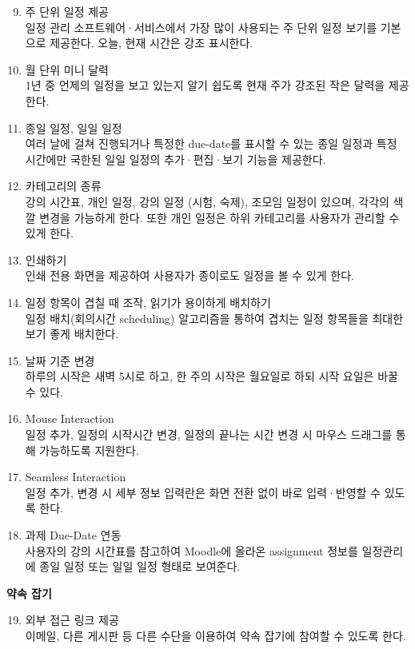 \documentclass[a4paper,titlepage]{article}
\begin{document}
\begin{funcreq}
\begin{enumerate}
		\setcounter{enumii}{8}
		\item 주 단위 일정 제공\\
		일정 관리 소프트웨어·서비스에서 가장 많이 사용되는 주 단위 일정 보기를 기본으로 제공한다. 
		오늘, 현재 시간은 강조 표시한다.
		\item 월 단위 미니 달력\\
		1년 중 언제의 일정을 보고 있는지 알기 쉽도록 현재 주가 강조된 작은 달력을 제공한다.
		\item 종일 일정, 일일 일정\\
		여러 날에 걸쳐 진행되거나 특정한 due-date를 표시할 수 있는 종일 일정과 특정 시간에만 국한된 일일 일정의 추가·편집·보기 기능을 제공한다.
		\item 카테고리의 종류\\
		강의 시간표, 개인 일정, 강의 일정 (시험, 숙제), 조모임 일정이 있으며, 각각의 색깔 변경을 가능하게 한다. 또한 개인 일정은 하위 카테고리를 사용자가 관리할 수 있게 한다.
		\item 인쇄하기\\
		인쇄 전용 화면을 제공하여 사용자가 종이로도 일정을 볼 수 있게 한다.
		\item 일정 항목이 겹칠 때 조작, 읽기가 용이하게 배치하기\\
		일정 배치(회의시간 scheduling) 알고리즘을 통하여 겹치는 일정 항목들을 최대한 보기 좋게 배치한다.
		\item 날짜 기준 변경\\
		하루의 시작은 새벽 5시로 하고, 한 주의 시작은 월요일로 하되 시작 요일은 바꿀 수 있다.
		\item Mouse Interaction\\
		일정 추가, 일정의 시작시간 변경, 일정의 끝나는 시간 변경 시 마우스 드래그를 통해 가능하도록 지원한다.
		\item Seamless Interaction\\
		일정 추가, 변경 시 세부 정보 입력란은 화면 전환 없이 바로 입력·반영할 수 있도록 한다.
		\item 과제 Due-Date 연동\\
		사용자의 강의 시간표를 참고하여 Moodle에 올라온 assignment 정보를 일정관리에 종일 일정 또는 일일 일정 형태로 보여준다. 
	\end{enumerate}
	\item\textbf{약속 잡기}
	\begin{enumerate}
		\setcounter{enumii}{18}
		\item 외부 접근 링크 제공\\
		이메일, 다른 게시판 등 다른 수단을 이용하여 약속 잡기에 참여할 수 있도록 한다.

\end{enumerate}
\end{funcreq}
\end{document}

